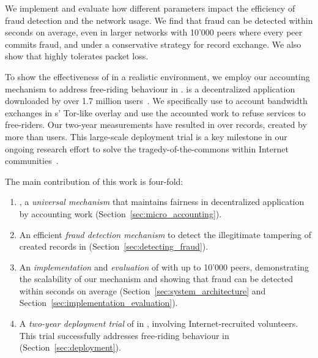 We implement \ModelName{} and evaluate how different parameters impact the efficiency of fraud detection and the network usage.
We find that fraud can be detected within seconds on average, even in larger networks with 10'000 peers where every peer commits fraud, and under a conservative strategy for record exchange.
We also show that \ModelName{} highly tolerates packet loss.

To show the effectiveness of \ModelName{} in a realistic environment, we employ our accounting mechanism to address free-riding behaviour in \Tribler{}.
\Tribler{} is a decentralized application downloaded by over 1.7 million users~\cite{pouwelse2008tribler}.
We specifically use \ModelName{} to account bandwidth exchanges in \Tribler{}s' Tor-like overlay and use the accounted work to refuse services to free-riders.
Our two-year measurements have resulted in over \TrialRecords{} records, created by more than \TrialUsers{} users.
This large-scale deployment trial is a key milestone in our ongoing research effort to solve the tragedy-of-the-commons within Internet communities~\cite{de2018blockchain}.

The main contribution of this work is four-fold:
\begin{enumerate}
	\item \ModelName{}, a \emph{universal mechanism} that maintains fairness in decentralized application by accounting work (Section~\ref{sec:micro_accounting}).
	\item An efficient \emph{fraud detection mechanism} to detect the illegitimate tampering of created records in \ModelName{} (Section~\ref{sec:detecting_fraud}).
	\item An \emph{implementation} and \emph{evaluation} of \ModelName{} with up to 10'000 peers, demonstrating the scalability of our mechanism and showing that fraud can be detected within seconds on average (Section~\ref{sec:system_architecture} and Section~\ref{sec:implementation_evaluation}).
	\item A \emph{two-year deployment trial} of \ModelName{} in \Tribler{}, involving \TrialUsers{} Internet-recruited volunteers. This trial successfully addresses free-riding behaviour in \Tribler{} (Section~\ref{sec:deployment}).
\end{enumerate}



